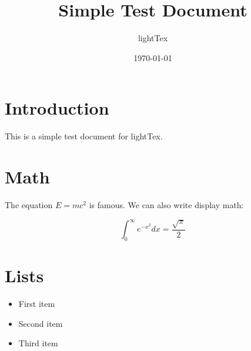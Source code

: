 \documentclass{article}
\title{Simple Test Document}
\author{lightTex}
\date{\today}
\begin{document}
\maketitle

\section{Introduction}

This is a simple test document for lightTex.

\section{Math}

The equation $E = mc^2$ is famous. We can also write display math:

\begin{equation}
    \int_0^\infty e^{-x^2} dx = \frac{\sqrt{\pi}}{2}
\end{equation}

\section{Lists}

\begin{itemize}
    \item First item
    \item Second item
    \item Third item
\end{itemize}
\end{document}
